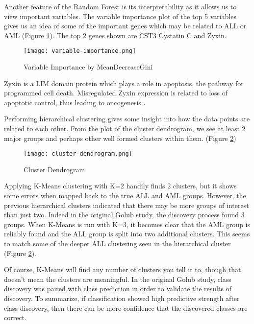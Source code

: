 \documentclass{article}
\begin{document}
Another feature of the Random Forest is its interpretability as it
allows us to view important variables. The variable importance plot of
the top 5 variables gives us an idea of some of the important genes
which may be related to ALL or AML (Figure
\ref{fig:variable-importance}). The top 2 genes shown are CST3
Cystatin C and Zyxin.

\begin{figure}
  \texttt{[image: variable-importance.png]}
  \caption{Variable Importance by MeanDecreaseGini}
  \label{fig:variable-importance}
\end{figure}

Zyxin is a LIM domain protein which plays a role in apoptosis, the
pathway for programmed cell death. Misregulated Zyxin expression is
related to loss of apoptotic control, thus leading to oncogenesis
\autocite{doi:10.1177/1947601910376192, Macalma06121996}.

Performing hierarchical clustering gives some insight into how the
data points are related to each other. From the plot of the cluster
dendrogram, we see at least 2 major groups and perhaps other well
formed clusters within them. (Figure \ref{fig:cluster-dendrogram})

\begin{figure}
  \texttt{[image: cluster-dendrogram.png]}
  \caption{Cluster Dendrogram}
  \label{fig:cluster-dendrogram}
\end{figure}

Applying K-Means clustering with K=2 handily finds 2 clusters, but it
shows some errors when mapped back to the true ALL and AML
groups. However, the previous hierarchical clusters indicated that
there may be more groups of interest than just two. Indeed in the
original Golub study, the discovery process found 3 groups. When
K-Means is run with K=3, it becomes clear that the AML group is
reliably found and the ALL group is split into two additional
clusters. This seems to match some of the deeper ALL clustering seen
in the hierarchical cluster (Figure \ref{fig:cluster-dendrogram}).

Of course, K-Means will find any number of clusters you tell it to,
though that doesn't mean the clusters are meaningful. In the original
Golub study, class discovery was paired with class prediction in order
to validate the results of discovery. To summarize, if classification
showed high predictive strength after class discovery, then there can
be more confidence that the discovered classes are correct.
\end{document}
